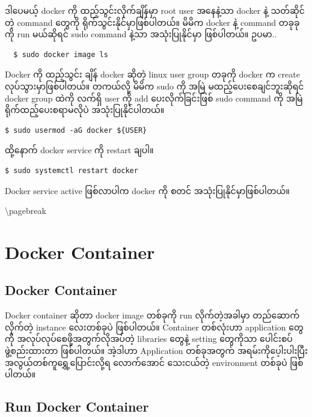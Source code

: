 ဒါပေမယ့် docker ကို ထည့်သွင်းလိုက်ချိန်မှာ root user အနေနဲ့သာ docker နဲ့
သတ်ဆိုင်တဲ့ command တွေကို ရိုက်သွင်းနိုင်မှာဖြစ်ပါတယ်။ မိမိက docker နဲ့
command တခုခုကို run မယ်ဆိုရင် sudo command နဲ့သာ အသုံးပြုနိုင်မှာ
ဖြစ်ပါတယ်။ ဥပမာ..

\begin{verbatim}
  $ sudo docker image ls
\end{verbatim}

Docker ကို ထည့်သွင်း ချိန် docker ဆိုတဲ့ linux user group တခုကို docker
က create လုပ်သွားမှာဖြစ်ပါတယ်။ တကယ်လို့ မိမိက sudo ကို အမြဲ
မထည့်ပေးစေချင်ဘူးဆိုရင် docker group ထဲကို လက်ရှိ user ကို add
ပေးလိုက်ခြင်းဖြစ် sudo command ကို အမြဲရိုက်ထည့်ပေးစရာမလိုပဲ
အသုံးပြုနိုင်ပါတယ်။

\begin{verbatim}
$ sudo usermod -aG docker ${USER}
\end{verbatim}

ထို့နောက် docker service ကို restart ချပါ။

\begin{verbatim}
$ sudo systemctl restart docker
\end{verbatim}

Docker service active ဖြစ်လာပါက docker ကို စတင်
အသုံးပြုနိုင်မှာဖြစ်ပါတယ်။

\textbackslash{}pagebreak

\section{Docker Container}\label{docker-container-1}

\subsection{Docker Container}\label{docker-container-2}

Docker container ဆိုတာ docker image တစ်ခုကို run လိုက်တဲ့အခါမှာ
တည်ဆောက်လိုက်တဲ့ instance လေးတစ်ခုပဲ ဖြစ်ပါတယ်။ Container တစ်လုံးဟာ
application တွေကို အလုပ်လုပ်စေဖို့အတွက်လိုအပ်တဲ့ libraries တွေနဲ့
setting တွေကိုသာ ပေါင်းစပ်ဖွဲ့စည်းထားတာ ဖြစ်ပါတယ်။ အဲ့ဒါဟာ Application
တစ်ခုအတွက် အရမ်းကိုပေ့ါးပါးပြီး အလွယ်တစ်ကူရွှေ့ပြောင်းလို့ရ လောက်အောင်
သေးငယ်တဲ့ environment တစ်ခုပဲ ဖြစ်ပါတယ်။

\subsection{Run Docker Container}\label{run-docker-container}

